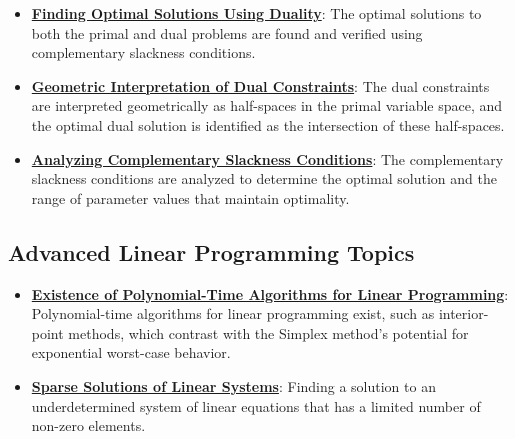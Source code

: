 \documentclass{article}%
\begin{document}
\begin{itemize}[leftmargin=*]
\item \href{https://www.math.purdue.edu/~yipn/421/2024-12-03-Duality.pdf#page=8}{\textbf{Finding Optimal Solutions Using Duality}}: The optimal solutions to both the primal and dual problems are found and verified using complementary slackness conditions.%
\item \href{https://www.math.purdue.edu/~yipn/421/2024-12-03-Duality.pdf#page=9}{\textbf{Geometric Interpretation of Dual Constraints}}: The dual constraints are interpreted geometrically as half-spaces in the primal variable space, and the optimal dual solution is identified as the intersection of these half-spaces.%
\item \href{https://www.math.purdue.edu/~yipn/421/2024-12-03-Duality.pdf#page=31}{\textbf{Analyzing Complementary Slackness Conditions}}: The complementary slackness conditions are analyzed to determine the optimal solution and the range of parameter values that maintain optimality.%
\end{itemize}

%
\subsection{Advanced Linear Programming Topics}%
\label{subsec:AdvancedLinearProgrammingTopics}%
\begin{itemize}[leftmargin=*]%
\item \href{https://www.math.purdue.edu/~yipn/421/2024-09-05-SimplexEfficiency.pdf#page=12}{\textbf{Existence of Polynomial-Time Algorithms for Linear Programming}}: Polynomial-time algorithms for linear programming exist, such as interior-point methods, which contrast with the Simplex method's potential for exponential worst-case behavior.%
\item \href{https://www.math.purdue.edu/~yipn/421/2024-10-28-ApplsLinProg.pdf#page=30}{\textbf{Sparse Solutions of Linear Systems}}: Finding a solution to an underdetermined system of linear equations that has a limited number of non-zero elements.%
\end{itemize}

%
\end{document}
